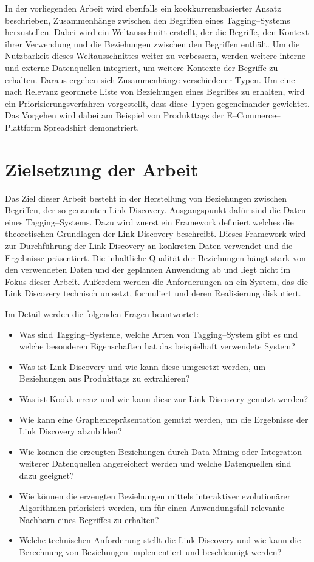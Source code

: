 In der vorliegenden Arbeit wird ebenfalls ein kookkurrenzbasierter Ansatz beschrieben, Zusammenhänge zwischen den Begriffen eines Tagging--Systems herzustellen. Dabei wird ein Weltausschnitt erstellt, der die Begriffe, den Kontext ihrer Verwendung und die Beziehungen zwischen den Begriffen enthält. Um die Nutzbarkeit dieses Weltausschnittes weiter zu verbessern, werden weitere interne und externe Datenquellen integriert, um weitere Kontexte der Begriffe zu erhalten. Daraus ergeben sich Zusammenhänge verschiedener Typen. Um eine nach Relevanz geordnete Liste von Beziehungen eines Begriffes zu erhalten, wird ein Priorisierungsverfahren vorgestellt, dass diese Typen gegeneinander gewichtet. Das Vorgehen wird dabei am Beispiel von Produkttags der E--Commerce--Plattform Spreadshirt demonstriert.

\section{Zielsetzung der Arbeit}

Das Ziel dieser Arbeit besteht in der Herstellung von Beziehungen zwischen Begriffen, der so genannten Link Discovery. Ausgangspunkt dafür sind die Daten eines Tagging--Systems. Dazu wird zuerst ein Framework definiert welches die theoretischen Grundlagen der Link Discovery beschreibt. Dieses Framework wird zur Durchführung der Link Discovery an konkreten Daten verwendet und die Ergebnisse präsentiert. Die inhaltliche Qualität der Beziehungen hängt stark von den verwendeten Daten und der geplanten Anwendung ab und liegt nicht im Fokus dieser Arbeit. Außerdem werden die Anforderungen an ein System, das die Link Discovery technisch umsetzt, formuliert und deren Realisierung diskutiert.

Im Detail werden die folgenden Fragen beantwortet:

\begin{itemize}
    \item Was sind Tagging--Systeme, welche Arten von Tagging--System gibt es und welche besonderen Eigenschaften hat das beispielhaft verwendete System?
    \item Was ist Link Discovery und wie kann diese umgesetzt werden, um Beziehungen aus Produkttags zu extrahieren?
    \item Was ist Kookkurrenz und wie kann diese zur Link Discovery genutzt werden?
    \item Wie kann eine Graphenrepräsentation genutzt werden, um die Ergebnisse der Link Discovery abzubilden?
    \item Wie können die erzeugten Beziehungen durch Data Mining oder Integration weiterer Datenquellen angereichert werden und welche Datenquellen sind dazu geeignet?
    \item Wie können die erzeugten Beziehungen mittels interaktiver evolutionärer Algorithmen priorisiert werden, um für einen Anwendungsfall relevante Nachbarn eines Begriffes zu erhalten?
    \item Welche technischen Anforderung stellt die Link Discovery und wie kann die Berechnung von Beziehungen implementiert und beschleunigt werden?
\end{itemize}

